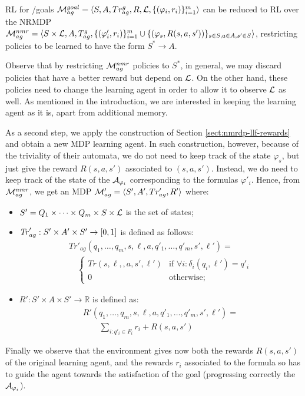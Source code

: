 \begin{theorem}\label{th:goal-nmr}
	RL for \LTLf /\LDLf goals
	$\mathcal{M}_{ag}^{goal}= \langle S, A, Tr^{g}_{ag}, R, \mathcal{L},
	\{(\varphi_i,r_i)\}_{i=1}^{m}\rangle$ can be reduced to RL over the
	NRMDP
	$\mathcal{M}_{ag}^{nmr} = \langle S\times \mathcal{L}, A, T_{ag}^{g},
	\{(\varphi'_i,r_i)\}_{i=1}^{m}\cup \{(\varphi_s, R(s,a, s'))\}_{s\in S,
		a\in A, s'\in S} \rangle$, 
	restricting policies to be learned to have the form $S^*\rightarrow A$.
\end{theorem}

Observe that by restricting $\mathcal{M}_{ag}^{nmr}$ policies to $S^*$, in general, we may discard policies that have a better reward but depend on $\mathcal{L}$. On the other hand, these policies need to change the learning agent in order to allow it to observe $\mathcal{L}$ as well. As mentioned in the introduction, we are interested in keeping the learning agent as it is, apart from additional memory.

\medskip
As a second step, we apply the construction of Section \ref{sect:nmrdp-llf-rewards} and obtain a
new MDP learning agent.  In such construction, however, because of the
triviality of their automata, we do not need to keep track of the state
$\varphi_s$, but just give the reward $R(s,a,s')$ associated to
$(s,a,s')$. Instead, we do need to keep track of the state of the \DFAs
$\mathcal{A}_{\varphi_i}$ corresponding to the formulas $\varphi'_i$.
Hence, from $\mathcal{M}_{ag}^{nmr}$, we get an MDP $\mathcal{M}_{ag}'=\langle S',A',Tr'_{ag},R'\rangle$ where:
\begin{itemize}\itemsep=0mm
	\item $S'=Q_1\times\cdots\times Q_m\times S\times \mathcal{L}$ is the set of states;
	\item $\mathit{Tr}'_{ag} : S'\times A' \times S'\rightarrow [0,1]$ is defined as follows:
	\[
	\begin{array}{l}
	Tr'_{ag}(q_1,\ldots,q_m, s,\ell, a, q'_1,\ldots,q'_m, s',\ell') = {}\\
	\quad\left\{
	\begin{array}{ll}
	Tr(s,\ell,,a,s',\ell') &\mbox{if } \forall i:\delta_i(q_i,\ell') = q'_i\\
	0 & \mbox{otherwise}; 
	\end{array}\right.
	\end{array}
	\] 
	\item $R': S'\times A \times S' \rightarrow 
	\mathbb{R}$ is defined as:
	\[\begin{array}{l}
	R'(q_1,\ldots,q_m, s,\ell, a, q'_1,\ldots,q'_m, s',\ell') = {}\\
	\qquad
	\sum_{i: q'_i\in F_i} r_i+R(s,a,s')
	\end{array}
	\] 
\end{itemize}
Finally we observe that the environment gives now both the rewards $R(s,a,s')$ of the original learning agent, and the rewards $r_i$ associated to the formula so has to guide the agent towards the satisfaction of the goal (progressing correctly the \DFAs $\mathcal{A}_{\varphi_i}$).

